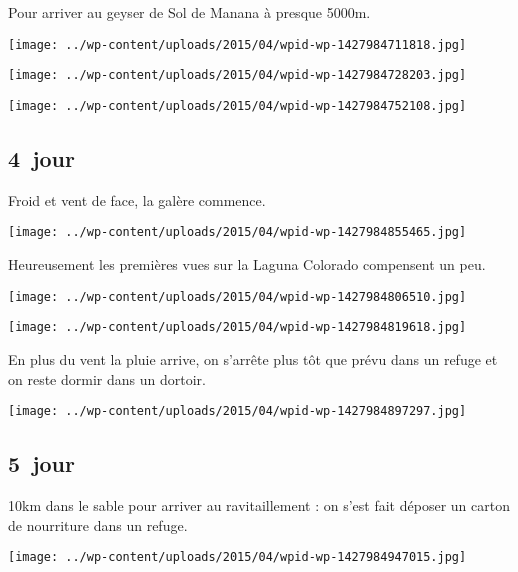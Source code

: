 \pagebreak
  Pour arriver au geyser de Sol de Manana à presque 5000m.
\begin{center} \texttt{[image: ../wp-content/uploads/2015/04/wpid-wp-1427984711818.jpg]} \end{center}
\begin{center} \texttt{[image: ../wp-content/uploads/2015/04/wpid-wp-1427984728203.jpg]} \end{center}
\begin{center} \texttt{[image: ../wp-content/uploads/2015/04/wpid-wp-1427984752108.jpg]} \end{center}

 \subsection*{4\ieme\ jour} 

 Froid et vent de face, la galère commence.
\begin{center} \texttt{[image: ../wp-content/uploads/2015/04/wpid-wp-1427984855465.jpg]} \end{center}
\vspace{-\topsep}

\pagebreak
 Heureusement les premières vues sur la Laguna Colorado compensent un peu.
\begin{center} \texttt{[image: ../wp-content/uploads/2015/04/wpid-wp-1427984806510.jpg]} \end{center}
\begin{center} \texttt{[image: ../wp-content/uploads/2015/04/wpid-wp-1427984819618.jpg]} \end{center}
\vspace{-\topsep}
\vspace{-2.75mm}

\pagebreak
 En plus du vent la pluie arrive, on s'arrête plus tôt que prévu dans un refuge et on reste dormir dans un dortoir.
\begin{center} \texttt{[image: ../wp-content/uploads/2015/04/wpid-wp-1427984897297.jpg]} \end{center}

 \subsection*{5\ieme\ jour} 

 10km dans le sable pour arriver au ravitaillement : on s'est fait déposer un carton de nourriture dans un refuge.
\begin{center} \texttt{[image: ../wp-content/uploads/2015/04/wpid-wp-1427984947015.jpg]} \end{center}

